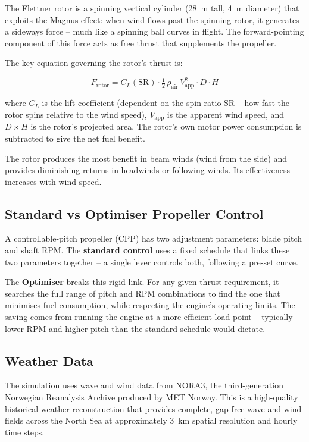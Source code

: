 \documentclass[a4paper,11pt]{article}
\begin{document}
The Flettner rotor is a spinning vertical cylinder (\SI{28}{\metre} tall,
\SI{4}{\metre} diameter) that exploits the Magnus effect: when wind flows past
the spinning rotor, it generates a sideways force -- much like a spinning ball
curves in flight.  The forward-pointing component of this force acts as free
thrust that supplements the propeller.

The key equation governing the rotor's thrust is:

\begin{equation}
  F_\text{rotor} = C_L(\text{SR}) \cdot \tfrac{1}{2}\,\rho_\text{air}\, V_\text{app}^2 \cdot D \cdot H
\end{equation}

where \(C_L\) is the lift coefficient (dependent on the spin ratio SR -- how fast
the rotor spins relative to the wind speed), \(V_\text{app}\) is the apparent wind
speed, and \(D \times H\) is the rotor's projected area.  The rotor's own motor
power consumption is subtracted to give the net fuel benefit.

The rotor produces the most benefit in beam winds (wind from the side) and
provides diminishing returns in headwinds or following winds.  Its effectiveness
increases with wind speed.

\subsection{Standard vs Optimiser Propeller Control}
\label{sec:orgaff9a6d}

A controllable-pitch propeller (CPP) has two adjustment parameters: blade pitch
and shaft RPM.  The \textbf{standard control} uses a fixed schedule that links these
two parameters together -- a single lever controls both, following a pre-set
curve.

The \textbf{Optimiser} breaks this rigid link.  For any given thrust requirement, it
searches the full range of pitch and RPM combinations to find the one that
minimises fuel consumption, while respecting the engine's operating limits.
The saving comes from running the engine at a more efficient load point --
typically lower RPM and higher pitch than the standard schedule would dictate.

\subsection{Weather Data}
\label{sec:org8583235}

The simulation uses wave and wind data from NORA3, the third-generation
Norwegian Reanalysis Archive produced by MET Norway.  This is a high-quality
historical weather reconstruction that provides complete, gap-free wave and wind
fields across the North Sea at approximately \SI{3}{\kilo\metre} spatial
resolution and hourly time steps.
\end{document}
